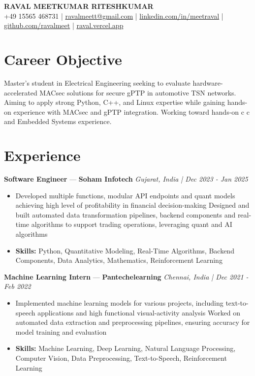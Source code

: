 \documentclass[a4paper,10pt]{article}
\begin{document}
\begin{center}
  {\Large\bfseries RAVAL MEETKUMAR RITESHKUMAR}\\[2pt]
  {\small +49 15565 468731 \;|\; \href{mailto:ravalmeett@gmail.com}{ravalmeett@gmail.com} \;|\; \href{https://www.linkedin.com/in/meetraval/}{linkedin.com/in/meetraval} \;|\; \href{https://github.com/ravalmeet}{github.com/ravalmeet} \;|\; \href{https://raval.vercel.app/}{raval.vercel.app}}
\end{center}
\vspace{-3pt}

\section*{Career Objective}
Master's student in Electrical Engineering seeking to evaluate hardware-accelerated MACsec solutions for secure gPTP in automotive TSN networks. Aiming to apply strong Python, C++, and Linux expertise while gaining hands-on experience with MACsec and gPTP integration. Working toward hands-on c c and Embedded Systems experience.\par

\section*{Experience}
\textbf{Software Engineer} — \textbf{Soham Infotech} \hfill \textit{Gujarat, India \;|\; Dec 2023 - Jan 2025}\par
\vspace{1pt}
\begin{itemize}
  \item Developed multiple functions, modular API endpoints and quant models achieving high level of profitability in financial decision-making Designed and built automated data transformation pipelines, backend components and real-time algorithms to support trading operations, leveraging quant and AI algorithms
  \item \textbf{Skills:} Python, Quantitative Modeling, Real-Time Algorithms, Backend Components, Data Analytics, Mathematics, Reinforcement Learning
\end{itemize}
\vspace{3pt}
\textbf{Machine Learning Intern} — \textbf{Pantechelearning} \hfill \textit{Chennai, India \;|\; Dec 2021 - Feb 2022}\par
\vspace{1pt}
\begin{itemize}
  \item Implemented machine learning models for various projects, including text-to-speech applications and high functional visual-activity analysis Worked on automated data extraction and preprocessing pipelines, ensuring accuracy for model training and evaluation
  \item \textbf{Skills:} Machine Learning, Deep Learning, Natural Language Processing, Computer Vision, Data Preprocessing, Text-to-Speech, Reinforcement Learning
\end{itemize}
\end{document}
